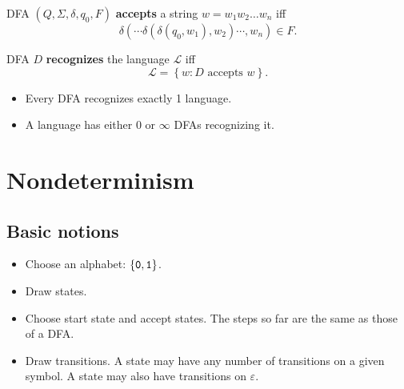\documentclass{notes}
\begin{document}
\begin{defn}
  DFA $(Q, \Sigma, \delta, q_{0}, F)$ {\boldmath \bfseries accepts} a string $w = w_1 w_2 \dots w_n$ iff
  \[
    \delta(\cdots \delta(\delta(q_0, w_1), w_2) \cdots, w_n) \in F.
  \]
\end{defn}

\begin{defn}
  DFA $D$ {\boldmath \bfseries recognizes} the language $\mathcal L$ iff 
  \[
    \mathcal L = \left \{ w : \text{$D$ accepts $w$} \right \}.
  \]
\end{defn}

\begin{note}
  \begin{itemize}
    \item Every DFA recognizes exactly 1 language.

    \item A language has either 0 or $\infty$ DFAs recognizing it.
  \end{itemize}
\end{note}

\section{Nondeterminism}

\subsection{Basic notions}

\begin{eg}
  \begin{center}
  \end{center}

  \begin{itemize}
    \item Choose an alphabet: $\left \{ \verb~0~, \verb~1~ \right \}$.

    \item Draw states.
      
    \item Choose start state and accept states.
    The steps so far are the same as those of a DFA.
      
    \item Draw transitions.
    A state may have any number of transitions on a given symbol.
    A state may also have transitions on $\varepsilon$.
  \end{itemize}
\end{eg}
\end{document}
